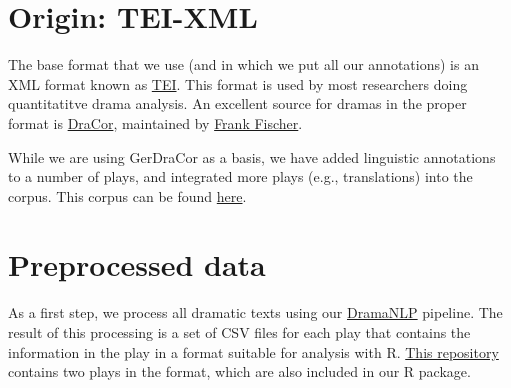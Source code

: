 \documentclass[]{book}
\begin{document}
\hypertarget{origin-tei-xml}{%
\section{Origin: TEI-XML}\label{origin-tei-xml}}

The base format that we use (and in which we put all our annotations) is an XML format known as \href{https://tei-c.org}{TEI}. This format is used by most researchers doing quantitatitve drama analysis. An excellent source for dramas in the proper format is \href{https://github.com/dracor-org/}{DraCor}, maintained by \href{https://www.hse.ru/en/org/persons/182492735}{Frank Fischer}.

While we are using GerDraCor as a basis, we have added linguistic annotations to a number of plays, and integrated more plays (e.g., translations) into the corpus. This corpus can be found \href{https://github.com/quadrama/Corpus}{here}.

\hypertarget{preprocessed-data}{%
\section{Preprocessed data}\label{preprocessed-data}}

As a first step, we process all dramatic texts using our \href{https://github.com/quadrama/DramaNLP}{DramaNLP} pipeline. The result of this processing is a set of CSV files for each play that contains the information in the play in a format suitable for analysis with R. \href{https://github.com/quadrama/data_test}{This repository} contains two plays in the format, which are also included in our R package.
\end{document}
